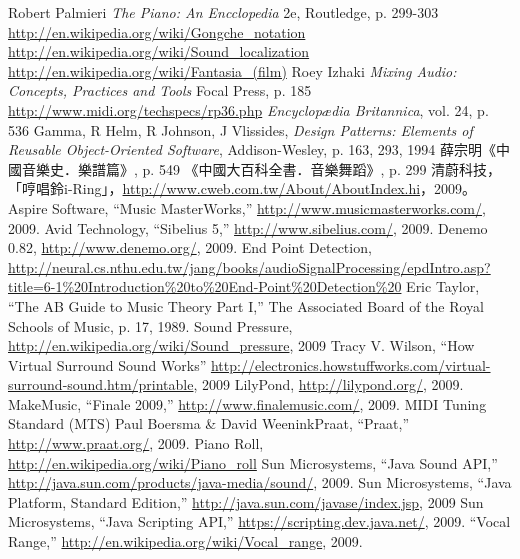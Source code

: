 \begin{thebibliography}{99} %
  Robert Palmieri
  \emph{The Piano: An Encclopedia}
  2e,
  Routledge,  
  p. 299-303
  \url{http://en.wikipedia.org/wiki/Gongche_notation}
  \url{http://en.wikipedia.org/wiki/Sound_localization}
  \url{http://en.wikipedia.org/wiki/Fantasia_(film)}
  Roey Izhaki
  \emph{Mixing Audio: Concepts, Practices and Tools}
  Focal Press,
  p. 185
  \url{http://www.midi.org/techspecs/rp36.php}
  \emph{Encyclopædia Britannica}, vol. 24, p. 536
  Gamma, R Helm, R Johnson, J Vlissides, 
  \emph{Design Patterns: Elements of Reusable Object-Oriented Software},
  Addison-Wesley, p. 163, 293, 
  1994
  薛宗明《中國音樂史．樂譜篇》, p. 549
  《中國大百科全書．音樂舞蹈》, p. 299
   清蔚科技，「哼唱鈴i-Ring」，\url{http://www.cweb.com.tw/About/AboutIndex.hi}，2009。
   Aspire Software, “Music MasterWorks,” \url{http://www.musicmasterworks.com/}, 2009.
   Avid Technology, “Sibelius 5,” \url{http://www.sibelius.com/}, 2009.
   Denemo 0.82, \url{http://www.denemo.org/}, 2009.
End Point Detection, \url{http://neural.cs.nthu.edu.tw/jang/books/audioSignalProcessing/epdIntro.asp?title=6-1%20Introduction%20to%20End-Point%20Detection%20}
   Eric Taylor, “The AB Guide to Music Theory Part I,” The Associated Board of the Royal Schools of Music, p. 17, 1989. 
   Sound Pressure, \url{http://en.wikipedia.org/wiki/Sound_pressure}, 2009
   Tracy V. Wilson, “How Virtual Surround Sound Works” \url{http://electronics.howstuffworks.com/virtual-surround-sound.htm/printable}, 2009
   LilyPond, \url{http://lilypond.org/}, 2009.
   MakeMusic, “Finale 2009,” \url{http://www.finalemusic.com/}, 2009.
   MIDI Tuning Standard (MTS) %
   Paul Boersma & David WeeninkPraat, “Praat,” \url{http://www.praat.org/}, 2009.
   Piano Roll, \url{http://en.wikipedia.org/wiki/Piano_roll}
   Sun Microsystems, “Java Sound API,” \url{http://java.sun.com/products/java-media/sound/}, 2009.
   Sun Microsystems, “Java Platform, Standard Edition,” \url{http://java.sun.com/javase/index.jsp}, 2009
   Sun Microsystems, “Java Scripting API,” \url{https://scripting.dev.java.net/}, 2009.
   “Vocal Range,” \url{http://en.wikipedia.org/wiki/Vocal_range}, 2009.
\end{thebibliography}


